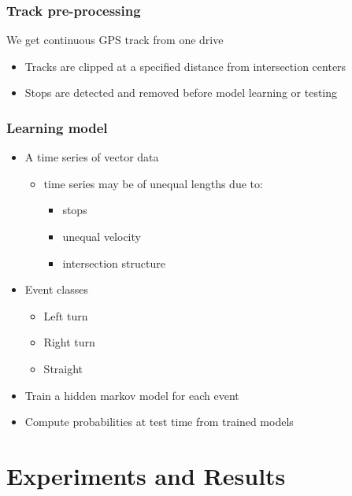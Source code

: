\documentclass{beamer}
\begin{document}
\begin{frame}
\frametitle{Track pre-processing}
	We get continuous GPS track from one drive
	\begin{itemize}
	\item Tracks are clipped at a specified distance from intersection centers
	\item Stops are detected and removed before model learning or testing
	\end{itemize}
	
\end{frame}

\begin{frame}
\frametitle{Learning model}
	\begin{itemize}
	  \item A time series of vector data
	  \begin{itemize}
	    \item time series may be of unequal lengths due to:
	    \begin{itemize}
	      \item stops
	      \item unequal velocity
	      \item intersection structure
	      \end{itemize}
	      \end{itemize}
	  \item Event classes
	  \begin{itemize}
	    \item Left turn
	    \item Right turn
	    \item Straight
	   \end{itemize}
	   \item Train a hidden markov model for each event
	   \item Compute probabilities at test time from trained models
	\end{itemize}
\end{frame}

\section{Experiments and Results}
\end{document}
